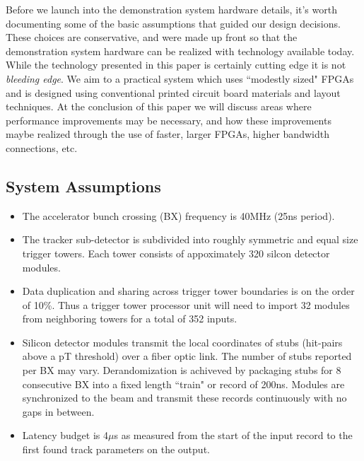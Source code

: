 \documentclass[letterpaper]{article}
\begin{document}
Before we launch into the demonstration system hardware details, it's worth documenting some of the basic assumptions that guided our design decisions. These choices are conservative, and were made up front so that the demonstration system hardware can be realized with technology available today. While the technology presented in this paper is certainly cutting edge it is not \emph{bleeding edge}. We aim to a practical system which uses ``modestly sized" FPGAs and is designed using conventional printed circuit board materials and layout techniques. At the conclusion of this paper we will discuss areas where performance improvements may be necessary, and how these improvements maybe realized through the use of faster, larger FPGAs, higher bandwidth connections, etc.

\subsection{System Assumptions}

\begin{itemize}

\item The accelerator bunch crossing (BX) frequency is 40MHz (25ns period).

\item The tracker sub-detector is subdivided into roughly symmetric and equal size trigger towers. Each tower consists of appoximately 320 silcon detector modules.

\item Data duplication and sharing across trigger tower boundaries is on the order of 10\%. Thus a trigger tower processor unit will need to import 32 modules from neighboring towers for a total of 352 inputs.

\item Silicon detector modules transmit the local coordinates of stubs (hit-pairs above a pT threshold) over a fiber optic link. The number of stubs reported per BX may vary. Derandomization is achiveved by packaging stubs for 8 consecutive BX into a fixed length ``train" or record of 200ns. Modules are synchronized to the beam and transmit these records continuously with no gaps in between.

\item Latency budget is 4$\mu$s as measured from the start of the input record to the first found track parameters on the output.

\end{itemize}
\end{document}
